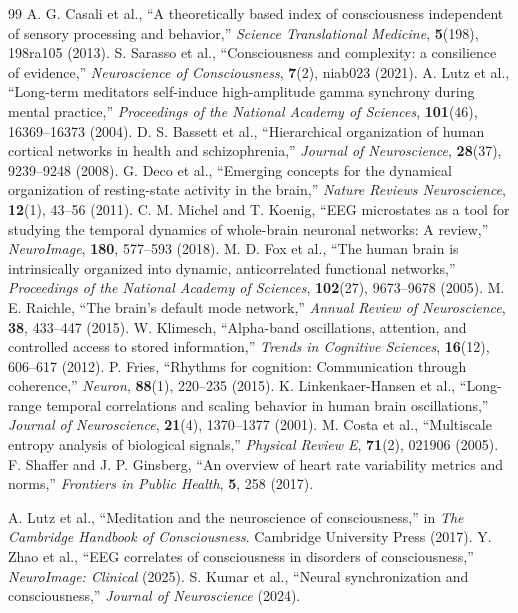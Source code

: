 \documentclass[12pt,a4paper]{article}
\begin{document}
\begin{thebibliography}{99}
			 A. G. Casali et al., ``A theoretically based index of consciousness independent of sensory processing and behavior,'' \emph{Science Translational Medicine}, \textbf{5}(198), 198ra105 (2013).
			 S. Sarasso et al., ``Consciousness and complexity: a consilience of evidence,'' \emph{Neuroscience of Consciousness}, \textbf{7}(2), niab023 (2021).
			 A. Lutz et al., ``Long-term meditators self-induce high-amplitude gamma synchrony during mental practice,'' \emph{Proceedings of the National Academy of Sciences}, \textbf{101}(46), 16369--16373 (2004).
			 D. S. Bassett et al., ``Hierarchical organization of human cortical networks in health and schizophrenia,'' \emph{Journal of Neuroscience}, \textbf{28}(37), 9239--9248 (2008).
			 G. Deco et al., ``Emerging concepts for the dynamical organization of resting-state activity in the brain,'' \emph{Nature Reviews Neuroscience}, \textbf{12}(1), 43--56 (2011).
			 C. M. Michel and T. Koenig, ``EEG microstates as a tool for studying the temporal dynamics of whole-brain neuronal networks: A review,'' \emph{NeuroImage}, \textbf{180}, 577--593 (2018).
			 M. D. Fox et al., ``The human brain is intrinsically organized into dynamic, anticorrelated functional networks,'' \emph{Proceedings of the National Academy of Sciences}, \textbf{102}(27), 9673--9678 (2005).
			 M. E. Raichle, ``The brain's default mode network,'' \emph{Annual Review of Neuroscience}, \textbf{38}, 433--447 (2015).
			 W. Klimesch, ``Alpha-band oscillations, attention, and controlled access to stored information,'' \emph{Trends in Cognitive Sciences}, \textbf{16}(12), 606--617 (2012).
			 P. Fries, ``Rhythms for cognition: Communication through coherence,'' \emph{Neuron}, \textbf{88}(1), 220--235 (2015).
			 K. Linkenkaer-Hansen et al., ``Long-range temporal correlations and scaling behavior in human brain oscillations,'' \emph{Journal of Neuroscience}, \textbf{21}(4), 1370--1377 (2001).
			 M. Costa et al., ``Multiscale entropy analysis of biological signals,'' \emph{Physical Review E}, \textbf{71}(2), 021906 (2005).
			 F. Shaffer and J. P. Ginsberg, ``An overview of heart rate variability metrics and norms,'' \emph{Frontiers in Public Health}, \textbf{5}, 258 (2017).
			
			 A. Lutz et al., ``Meditation and the neuroscience of consciousness,'' in \emph{The Cambridge Handbook of Consciousness}. Cambridge University Press (2017).
			 Y. Zhao et al., ``EEG correlates of consciousness in disorders of consciousness,'' \emph{NeuroImage: Clinical} (2025).
			 S. Kumar et al., ``Neural synchronization and consciousness,'' \emph{Journal of Neuroscience} (2024).
			

\end{thebibliography}
\end{document}
